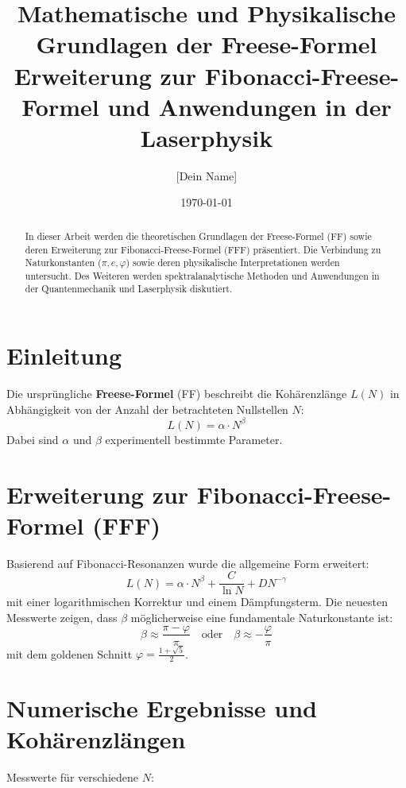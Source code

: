 \documentclass[a4paper,12pt]{article}
\title{Mathematische und Physikalische Grundlagen der Freese-Formel \\ 
\Large Erweiterung zur Fibonacci-Freese-Formel und Anwendungen in der Laserphysik}
\author{[Dein Name]}
\date{\today}
\begin{document}
\maketitle

\begin{abstract}
In dieser Arbeit werden die theoretischen Grundlagen der Freese-Formel (FF) sowie deren Erweiterung zur Fibonacci-Freese-Formel (FFF) präsentiert. Die Verbindung zu Naturkonstanten (\(\pi, e, \varphi\)) sowie deren physikalische Interpretationen werden untersucht. Des Weiteren werden spektralanalytische Methoden und Anwendungen in der Quantenmechanik und Laserphysik diskutiert.
\end{abstract}

\section{Einleitung}
Die ursprüngliche \textbf{Freese-Formel} (FF) beschreibt die Kohärenzlänge \( L(N) \) in Abhängigkeit von der Anzahl der betrachteten Nullstellen \( N \):
\begin{equation}
L(N) = \alpha \cdot N^\beta
\end{equation}
Dabei sind \( \alpha \) und \( \beta \) experimentell bestimmte Parameter.

\section{Erweiterung zur Fibonacci-Freese-Formel (FFF)}
Basierend auf Fibonacci-Resonanzen wurde die allgemeine Form erweitert:
\begin{equation}
L(N) = \alpha \cdot N^\beta + \frac{C}{\ln N} + D N^{-\gamma}
\end{equation}
mit einer logarithmischen Korrektur und einem Dämpfungsterm. Die neuesten Messwerte zeigen, dass \( \beta \) möglicherweise eine fundamentale Naturkonstante ist:
\begin{equation}
\beta \approx \frac{\pi - \varphi}{\pi} \quad \text{oder} \quad \beta \approx -\frac{\varphi}{\pi}
\end{equation}
mit dem goldenen Schnitt \( \varphi = \frac{1+\sqrt{5}}{2} \).

\section{Numerische Ergebnisse und Kohärenzlängen}
Messwerte für verschiedene \( N \):
\end{document}

